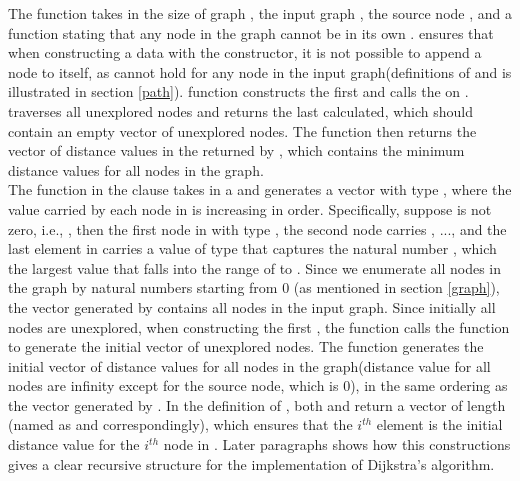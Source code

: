 The  function takes in the size of graph , the input graph , the source node , and a function  stating that any node in the graph cannot be in its own .  ensures that when constructing a  data with the  constructor, it is not possible to append a node  to itself, as  cannot hold for any node in the input graph(definitions of  and  is illustrated in section \ref{path}).  function constructs the first   and calls the  on .  traverses all unexplored nodes and returns the last  calculated, which should contain an empty vector of unexplored nodes. The  function then returns the vector of distance values in the  returned by , which contains the minimum distance values for all nodes in the graph. 
\\

The  function in the  clause takes in a  and generates a vector  with type , where the  value carried by each node in  is increasing in order. Specifically, suppose  is not zero, i.e., , then the first node in   with type , the second node carries , ..., and the last element in  carries a value of type  that captures the natural number , which the largest  value that falls into the range of  to . Since we enumerate all nodes in the graph by natural numbers starting from 0 (as mentioned in section \ref{graph}), the vector generated by  contains all nodes in the input graph. Since initially all nodes are unexplored, when constructing the first , the  function calls the  function to generate the initial vector of unexplored nodes. The  function generates the initial vector of distance values for all nodes in the graph(distance value for all nodes are infinity except for the source node, which is 0), in the same ordering as the vector generated by . In the definition of , both  and  return a vector of length  (named as  and  correspondingly), which ensures that the $i^{th}$ element  is the initial distance value for the $i^{th}$ node in . Later paragraphs shows how this constructions gives a clear recursive structure for the implementation of Dijkstra's algorithm. 
\\

